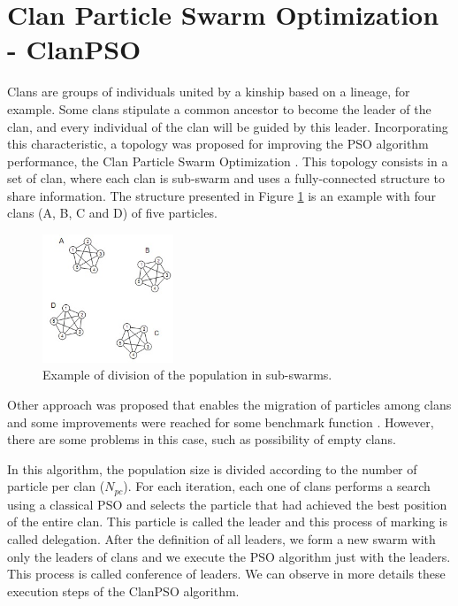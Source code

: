 \section{Clan Particle Swarm Optimization - ClanPSO}\label{sec:ClanPSO}
Clans are groups of individuals united by a kinship based on a lineage, for example. Some clans stipulate a common ancestor to become the leader of the clan, and every individual of the clan will be guided by this leader. Incorporating this characteristic, a topology was proposed for improving the PSO algorithm performance, the Clan Particle Swarm Optimization \cite{ClanPSO:Carvalho2008}. This topology consists in a set of clan, where each clan is sub-swarm and uses a fully-connected structure to share information. The structure presented in Figure \ref{fig:clans} is an example with four clans (A, B, C and D) of five particles.
\begin{figure}[!h]
\centering
 \includegraphics[width=0.35\textwidth]{image/Clan}
 \caption{\small{Example of division of the population in sub-swarms.}}
 \label{fig:clans}
\end{figure}

Other approach was proposed that enables the migration of particles among clans and some improvements were reached for some benchmark function \cite{ClanPSO:Carvalho2009}. However, there are some problems in this case, such as possibility of empty clans.

In this algorithm, the population size is divided according to the number of particle per clan ($N_{pc}$). For each iteration, each one of clans performs a search using a classical PSO and selects the particle that had achieved the best position of the entire clan. This particle is called the leader and this process of marking is called delegation. After the definition of all leaders, we form a new swarm with only the leaders of clans and we execute the PSO algorithm just with the leaders. This process is called conference of leaders. We can observe in more details these execution steps of the ClanPSO algorithm.

